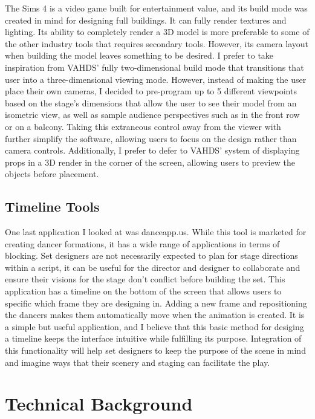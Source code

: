 \documentclass[10pt,twocolumn]{article}
\begin{document}
The Sims 4 is a video game built for entertainment value, and its build mode was created in mind for designing full buildings. It can fully render textures and lighting. Its ability to completely render a 3D model is more preferable to some of the other industry tools that requires secondary tools. However, its camera layout when building the model leaves something to be desired. I prefer to take inspiration from VAHDS' fully two-dimensional build mode that transitions that user into a three-dimensional viewing mode. However, instead of making the user place their own cameras, I decided to pre-program up to 5 different viewpoints based on the stage's dimensions that allow the user to see their model from an isometric view, as well as sample audience perspectives such as in the front row or on a balcony. Taking this extraneous control away from the viewer with further simplify the software, allowing users to focus on the design rather than camera controls. Additionally, I prefer to defer to VAHDS' system of displaying props in a 3D render in the corner of the screen, allowing users to preview the objects before placement. 

\subsection{Timeline Tools}
One last application I looked at was danceapp.us. While this tool is marketed for creating dancer formations, it has a wide range of applications in terms of blocking. Set designers are not necessarily expected to plan for stage directions within a script, it can be useful for the director and designer to collaborate and ensure their visions for the stage don't conflict before building the set. This application has a timeline on the bottom of the screen that allows users to specific which frame they are designing in. Adding a new frame and repositioning the dancers makes them automatically move when the animation is created. It is a simple but useful application, and I believe that this basic method for desiging a timeline keeps the interface intuitive while fulfilling its purpose. Integration of this functionality will help set designers to keep the purpose of the scene in mind and imagine ways that their scenery and staging can facilitate the play.  

\section{Technical Background}
\end{document}
